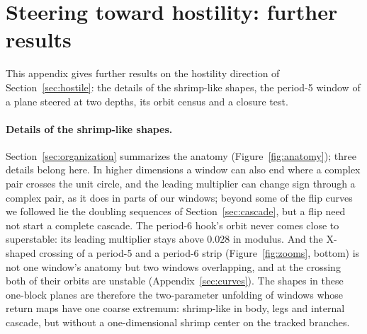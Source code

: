 \documentclass[11pt,letterpaper]{article}
\begin{document}
\section{Steering toward hostility: further results}
\label{sec:hostility}
This appendix gives further results on the hostility direction of Section~\ref{sec:hostile}: the details of the shrimp-like shapes, the period-5 window of a plane steered at two depths, its orbit census and a closure test.

\paragraph{Details of the shrimp-like shapes.} Section~\ref{sec:organization} summarizes the anatomy (Figure~\ref{fig:anatomy}); three details belong here. In higher dimensions a window can also end where a
complex pair crosses the unit circle, and the leading multiplier can change sign through a complex pair, as it does in
parts of our windows; beyond some of the flip curves we followed lie the doubling sequences of
Section~\ref{sec:cascade}, but a flip need not start a complete cascade. The period-6 hook's orbit never comes close
to superstable: its leading multiplier stays above $0.028$ in modulus. And the X-shaped crossing of a period-5 and a
period-6 strip (Figure~\ref{fig:zooms}, bottom) is not one window's anatomy but two windows overlapping, and at the
crossing both of their orbits are unstable (Appendix~\ref{sec:curves}). The shapes in these one-block planes are
therefore the two-parameter unfolding of windows whose return maps have one coarse extremum: shrimp-like in body,
legs and internal cascade, but without a one-dimensional shrimp center on the tracked branches.
\end{document}
